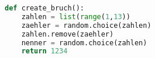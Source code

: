 \documentclass[a4paper,ngerman,12pt]{scrartcl}
\begin{document}
 
 
\begin{lstlisting}[language={Python}]
def create_bruch():
    zahlen = list(range(1,13))
    zaehler = random.choice(zahlen)
    zahlen.remove(zaehler)
    nenner = random.choice(zahlen)
    return 1234
\end{lstlisting}
 
\end{document}
